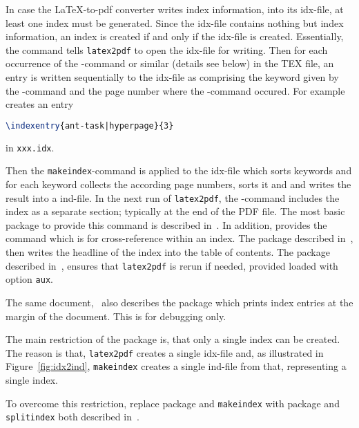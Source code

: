 In case the \LaTeX{}-to-pdf converter writes index information, 
into its \gls{idx}-file, at least one index must be generated. 
Since the \gls{idx}-file contains nothing but index information, 
an index is created if and only if the \gls{idx}-file is created. 
Essentially, 
the command  tells \texttt{latex2pdf} 
to open the \gls{idx}-file for writing. 
Then for each occurrence of the -command 
or similar (details see below) in the TEX file, 
an entry is written sequentially to the \gls{idx}-file as 
 comprising the keyword given by the -command 
and the page number where the -command occured. 
For example  creates an entry 
%
\begin{lstlisting}[language=TeX]
\indexentry{ant-task|hyperpage}{3}
\end{lstlisting}
%
in \texttt{xxx.idx}. 

Then the \texttt{makeindex}-command is applied to the \gls{idx}-file 
which sorts keywords and for each keyword collects the according page numbers, 
sorts it and and writes the result into a \gls{ind}-file. 
In the next run of \texttt{latex2pdf}, 
the -command includes the index as a separate section; 
typically at the end of the PDF file. 
The most basic package to provide this command 
is  described in~\cite{MkidxShIdxP}. 
In addition,  provides the command  
which is for cross-reference within an index. 
The package  described in~\cite{TocBibIndP}, 
then writes the headline of the index into the table of contents.
The package  described in~\cite{RerunFChkP}, 
ensures that \texttt{latex2pdf} is rerun if needed, 
provided loaded with option \texttt{aux}. 

The same document,~\cite{MkidxShIdxP} 
also describes the package  
which prints index entries at the margin of the document. 
This is for debugging only. 
\medskip


The main restriction of the package  is, 
that only a single index can be created. 
The reason is that, \texttt{latex2pdf} creates a single \gls{idx}-file 
and, as illustrated in Figure~\ref{fig:idx2ind}, 
\texttt{makeindex} creates a single ind-file from that, 
representing a single index. 

To overcome this restriction, 
replace package  and \texttt{makeindex} 
with package  and \texttt{splitindex} 
both described in~\cite{SplitidxP}. 

